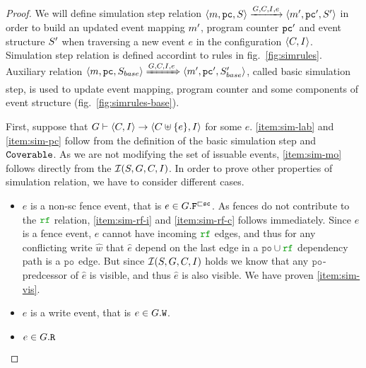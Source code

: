\documentclass[12pt]{article}
\begin{document}
\begin{proof}
  We will define simulation step relation 
  $\langle m, {\mathtt{pc}}, S \rangle \xrightarrow{G, C, I, e} \langle m', {\mathtt{pc}}', S' \rangle$
  in order to build an updated event mapping $m'$, program counter ${\mathtt{pc}}'$ 
  and event structure $S'$ 
  when traversing a new event $e$ in the configuration $\langle C, I \rangle$.
  Simulation step relation is defined accordint to rules in fig.~\ref{fig:simrules}.
  Auxiliary relation 
  $\langle m, {\mathtt{pc}}, S_{base} \rangle \xRightarrow{G, C, I, e} \langle m', {\mathtt{pc}}', S'_{base} \rangle$,
  called basic simulation step, 
  is used to update event mapping, program counter and some components of event structure
  (fig.~\ref{fig:simrules-base}).

  First, suppose that 
  $G \vdash \langle C, I \rangle \rightarrow \langle C \uplus \{e\}, I \rangle$ for some $e$.
  \ref{item:sim-lab} and \ref{item:sim-pc} follow
  from the definition of the basic simulation step and ${\mathtt{Coverable}}$.
  As we are not modifying the set of issuable events, 
  \ref{item:sim-mo} follows directly from the $\mathcal{I}(S, G, C, I)$.
  In order to prove other properties of simulation relation,
  we have to consider different cases.

  \begin{itemize}
    \item $e$ is a non-sc fence event, that is $e \in G.{\mathtt{F}}^{\sqsubset{\mathtt{sc}}}$. 
      As fences do not contribute to the $\lRF$ relation, 
      \ref{item:sim-rf-i} and \ref{item:sim-rf-c} follows immediately.
      Since $e$ is a fence event, $\hat{e}$ cannot have incoming $\lRF$ edges,
      and thus for any conflicting write $\hat{w}$ that $\hat{e}$ depend on
      the last edge in a $\lPO \cup \lRF$ dependency path is a $\lPO$ edge.
      But since $\mathcal{I}(S, G, C, I)$ holds we know that 
      any $\lPO$-predcessor of $\hat{e}$ is visible, and thus $\hat{e}$ is also visible.
      We have proven \ref{item:sim-vis}.

    \item $e$ is a write event, that is $e \in G.{\mathtt{W}}$. 
      

    \item $e \in G.{\mathtt{R}}$


  \end{itemize}
\end{proof}
\end{document}
